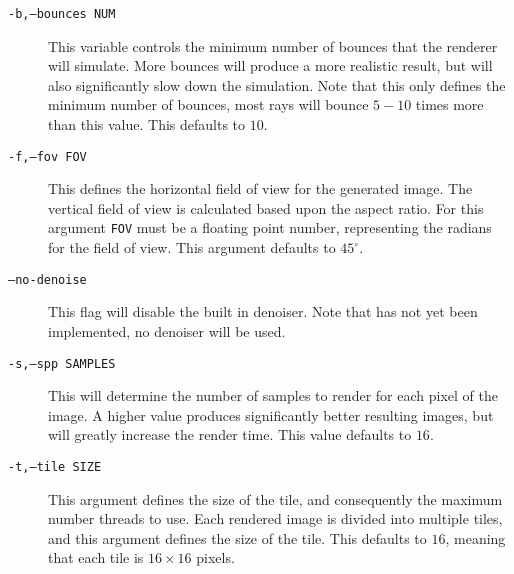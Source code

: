 \documentclass[../pbr.tex]{subfile}
\begin{document}
\begin{description}
  \item[\texttt{-b,--bounces NUM}] This variable controls the minimum number of
    bounces that the renderer will simulate. More bounces will produce a more
    realistic result, but will also significantly slow down the simulation.
    Note that this only defines the minimum number of bounces, most rays will
    bounce $5-10$ times more than this value. This defaults to $10$.
  \item[\texttt{-f,--fov FOV}] This defines the horizontal field of view for
    the generated image. The vertical field of view is calculated based upon
    the aspect ratio. For this argument \texttt{FOV} must be a floating point
    number, representing the radians for the field of view. This argument
    defaults to $45^\circ$.
  \item[\texttt{--no-denoise}] This flag will disable the built in denoiser.
    Note that has not yet been implemented, no denoiser will be used.
  \item[\texttt{-s,--spp SAMPLES}] This will determine the number of samples to
    render for each pixel of the image. A higher value produces significantly
    better resulting images, but will greatly increase the render time. This
    value defaults to $16$.
  \item[\texttt{-t,--tile SIZE}] This argument defines the size of the tile,
    and consequently the maximum number threads to use. Each rendered image is
    divided into multiple tiles, and this argument defines the size of the
    tile. This defaults to $16$, meaning that each tile is $16\times 16$
    pixels.
\end{description}
\end{document}

